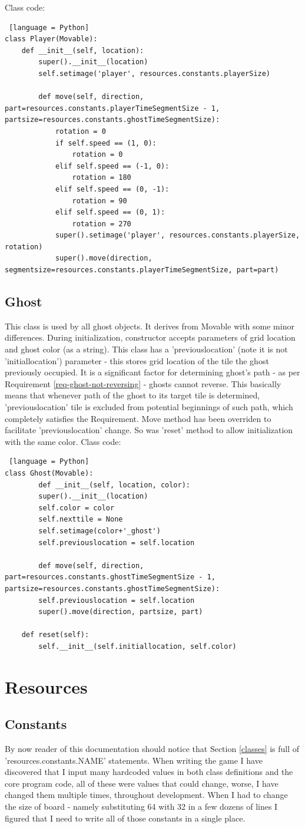 \documentclass[11pt,a4paper,notitlepage]{report}
\newcommand{\dsubsection}[1]{\FloatBarrier \subsection{#1}}
\begin{document}
				Class code:
				\begin{lstlisting} [language = Python]
class Player(Movable):
	def __init__(self, location):
		super().__init__(location)
		self.setimage('player', resources.constants.playerSize)
		
		def move(self, direction, part=resources.constants.playerTimeSegmentSize - 1, partsize=resources.constants.ghostTimeSegmentSize):
			rotation = 0
			if self.speed == (1, 0):
				rotation = 0
			elif self.speed == (-1, 0):
				rotation = 180
			elif self.speed == (0, -1):
				rotation = 90
			elif self.speed == (0, 1):
				rotation = 270
			super().setimage('player', resources.constants.playerSize, rotation)
			super().move(direction, segmentsize=resources.constants.playerTimeSegmentSize, part=part)
				\end{lstlisting}
			\dsubsection{Ghost}
				This class is used by all ghost objects. It derives from Movable with some minor differences. 
				During initialization, constructor accepts parameters of grid location and ghost color (as a string).
				This class has a 'previouslocation' (note it is not 'initiallocation') parameter - this stores grid location of the tile the ghost previously occupied. It is a significant factor for determining ghost's path - as per Requirement \ref{req-ghost-not-reversing} - ghosts cannot reverse. This basically means that whenever path of the ghost to its target tile is determined, 'previouslocation' tile is excluded from potential beginnings of such path, which completely satisfies the Requirement. Move method has been overriden to facilitate 'previouslocation' change. So was 'reset' method to allow initialization with the same color.
				Class code:
				\begin{lstlisting} [language = Python]
class Ghost(Movable):
		def __init__(self, location, color):
		super().__init__(location)
		self.color = color
		self.nexttile = None
		self.setimage(color+'_ghost')
		self.previouslocation = self.location
	
		def move(self, direction, part=resources.constants.ghostTimeSegmentSize - 1, partsize=resources.constants.ghostTimeSegmentSize):
		self.previouslocation = self.location
		super().move(direction, partsize, part)
	
	def reset(self):
		self.__init__(self.initiallocation, self.color)
				\end{lstlisting}
		\section{Resources}
			\label{resources}
			\dsubsection{Constants}
				\label{constants}
				By now reader of this documentation should notice that Section \ref{classes} is full of 'resources.constants.NAME' statements. When writing the game I have discovered that I input many hardcoded values in both class definitions and the core program code, all of these were values that could change, worse, I have changed them multiple times, throughout development. When I had to change the size of board - namely substituting 64 with 32 in a few dozens of lines I figured that I need to write all of those constants in a single place.
				
\end{document}
